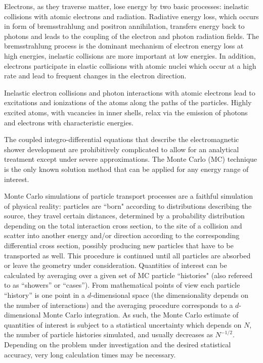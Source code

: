 Electrons, as they traverse matter, lose energy by two basic processes:
inelastic collisions with atomic electrons and radiation.
Radiative energy loss, which occurs in form of bremsstrahlung and
positron annihilation, transfers energy back to photons
and leads to the coupling of the electron and photon
radiation fields. The bremsstrahlung process is the dominant
mechanism of electron energy loss at high energies, inelastic collisions
are more important at low energies.
In addition, electrons participate in elastic collisions with atomic
nuclei which occur at a high rate and lead to frequent changes
in the electron direction.

Inelastic electron collisions and photon interactions with atomic electrons
lead to excitations and ionizations of the atoms along the paths of
the particles. Highly excited atoms, with vacancies in inner shells,
relax via the emission of photons and electrons with
characteristic energies.

The coupled integro-differential equations
that describe the electromagnetic shower development are
prohibitively complicated to allow for an analytical treatment
except under severe approximations. The Monte Carlo (MC) technique
is the only known solution method that can be applied for
any energy range of interest.

Monte Carlo
simulations of particle transport processes are a faithful simulation
of physical reality: particles are ``born" according to distributions
describing the source, they travel certain distances, determined by a
probability distribution depending on the total interaction
cross section, to the site of a collision and scatter into
another energy and/or direction according to the corresponding
differential cross section, possibly producing new
particles that have to be transported as well.
This procedure is continued until all particles are
absorbed or leave the geometry under consideration.
Quantities of interest can be calculated by averaging over a given set of
MC particle ``histories" (also refereed to as ``showers'' or
``cases''). From mathematical points of view each particle
``history'' is one point in a $d$-dimensional space (the dimensionality
depends on the number of interactions) and the averaging procedure
corresponds to a $d$-dimensional Monte Carlo integration.
As such, the Monte Carlo estimate of quantities of interest
is subject to a
statistical uncertainty which depends on
$N$, the number of particle histories simulated,
and usually decreases as $N^{-1/2}$. Depending on the
problem under investigation and the desired statistical
accuracy, very long calculation times may be necessary.

